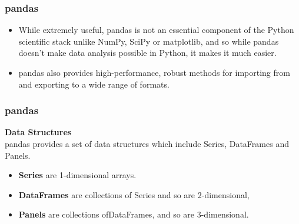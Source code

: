 \documentclass[MASTER.tex]{subfiles}
\begin{document}
\begin{frame}
	\frametitle{pandas}
	\large


	\begin{itemize}
	\item While extremely useful, pandas is not an essential
	component of the Python scientific stack unlike NumPy, SciPy or matplotlib, and so while pandas doesn’t
	make data analysis possible in Python, it makes it much easier. \item pandas also provides high-performance,
	robust methods for importing from and exporting to a wide range of formats.
	\end{itemize}
\end{frame}
\begin{frame}
	\frametitle{pandas}
\textbf{Data Structures}\\
pandas provides a set of data structures which include Series, DataFrames and Panels.
\begin{itemize}
\item \textbf{Series} are 1-dimensional
	arrays.
	\item \textbf{DataFrames} are collections of Series and so are 2-dimensional, 
\item  \textbf{Panels} are collections ofDataFrames,
	and so are 3-dimensional.
	\end{itemize}
\end{frame}
\end{document}
